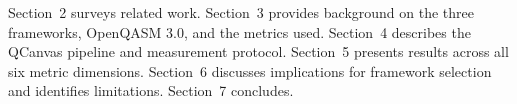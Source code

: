 Section~2 surveys related work.
Section~3 provides background on the three frameworks, OpenQASM 3.0, and
the metrics used.
Section~4 describes the QCanvas pipeline and measurement protocol.
Section~5 presents results across all six metric dimensions.
Section~6 discusses implications for framework selection and identifies
limitations.
Section~7 concludes.
